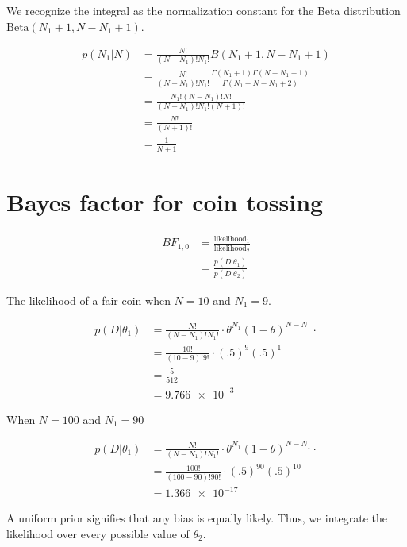 \documentclass{article}
\begin{document}
We recognize the integral as the normalization constant for the Beta
distribution $\text{Beta}(N_1 + 1, N - N_1 + 1)$.

\begin{align*}
           p(N_1|N) &= \frac{N!}{(N-N_1)!N_1!} B(N_1 + 1, N - N_1
                      + 1) \\
                    &= \frac{N!}{(N-N_1)!N_1!} \frac{\Gamma(N_1 +
                      1)\Gamma(N-N_1+1)}{\Gamma(N_1+N-N_1+2)} \\
                    &= \frac{N_1!(N-N_1)!N!}{(N-N_1)!N_1!(N+1)!} \\
                    &= \frac{N!}{(N+1)!} \\
                    &= \frac{1}{N+1}
\end{align*}

\section{Bayes factor for coin tossing}

\begin{align*}
  BF_{1,0} &= \frac{\text{likelihood}_1}{\text{likelihood}_2} \\
          &= \frac{p(D|\theta_1)}{p(D|\theta_2)}
\end{align*}

The likelihood of a fair coin when $N = 10$ and $N_1 = 9$.

\begin{align*}
  p(D|\theta_1) &= \frac{N!}{(N-N_1)!N_1!} \cdot \theta^{N_1}(1 - \theta)^{N - N_1} \cdot \\
                &= \frac{10!}{(10-9)!9!} \cdot (.5)^9(.5)^1 \\
                &= \frac{5}{512} \\
                &= \num{9.766e-3}
\end{align*}

When $N = 100$ and $N_1 = 90$

\begin{align*}
  p(D|\theta_1) &= \frac{N!}{(N-N_1)!N_1!} \cdot \theta^{N_1}(1 - \theta)^{N - N_1} \cdot \\
                &= \frac{100!}{(100-90)!90!} \cdot (.5)^{90}(.5)^{10} \\
                &= \num{1.366e-17}
\end{align*}

A uniform prior signifies that any bias is equally likely. Thus, we
integrate the likelihood over every possible value of $\theta_2$.
\end{document}
